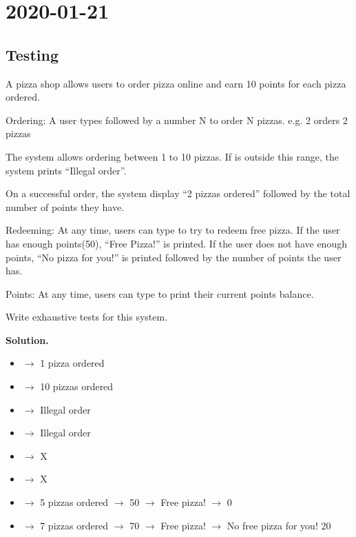 \section{2020-01-21}
\subsection{Testing}
A pizza shop allows users to order pizza online and earn 10 points for each pizza
ordered.

Ordering: A user types  followed by a number N to order N pizzas.
e.g.  2 orders 2 pizzas

The system allows ordering between 1 to 10 pizzas.
If  is outside this range, the system prints ``Illegal order''.

On a successful order, the system display ``2 pizzas ordered''
followed by the total number of points they have.

Redeeming: At any time, users can type  to try to redeem free pizza.
If the user has enough points(50), ``Free Pizza!'' is printed.
If the user does not have enough points, ``No pizza for you!''
is printed followed by the number of points the user has.

Points: At any time, users can type  to print their current points balance.

Write exhaustive tests for this system.

\textbf{Solution.}

\begin{itemize}
    \item {} $ \rightarrow $ 1 pizza ordered
    \item {} $ \rightarrow $ 10 pizzas ordered
    \item {} $ \rightarrow $ Illegal order
    \item {} $ \rightarrow $ Illegal order
    \item {} $ \rightarrow $ X
    \item {} $ \rightarrow $ X
    \item {} $ \rightarrow $ 5 pizzas ordered
    \subitem {} $ \rightarrow $ 50
    \subitem {} $ \rightarrow $ Free pizza!
    \subitem {} $ \rightarrow $ 0
    \item {} $ \rightarrow $ 7 pizzas ordered
    \subitem {} $ \rightarrow $ 70
    \subitem {} $ \rightarrow $ Free pizza!
    \subitem {} $ \rightarrow $ No free pizza for you! 20
\end{itemize}

